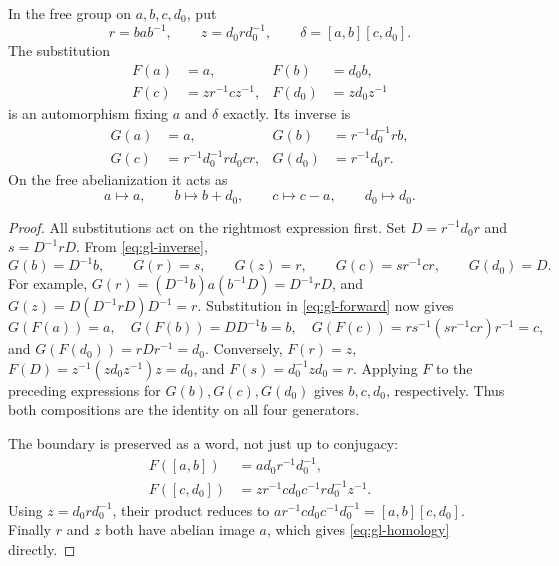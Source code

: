 \begin{lemma}\label{lem:gl-word}
In the free group on $a,b,c,d_0$, put
\[
 r=bab^{-1},\qquad z=d_0rd_0^{-1},\qquad
 \delta=[a,b][c,d_0].
\]
The substitution
\begin{equation}\label{eq:gl-forward}
 \begin{aligned}
 F(a)&=a,& F(b)&=d_0b,\\
 F(c)&=zr^{-1}cz^{-1},&F(d_0)&=zd_0z^{-1}
 \end{aligned}
\end{equation}
is an automorphism fixing $a$ and $\delta$ exactly. Its inverse is
\begin{equation}\label{eq:gl-inverse}
 \begin{aligned}
 G(a)&=a,&G(b)&=r^{-1}d_0^{-1}rb,\\
 G(c)&=r^{-1}d_0^{-1}rd_0cr,&G(d_0)&=r^{-1}d_0r.
 \end{aligned}
\end{equation}
On the free abelianization it acts as
\begin{equation}\label{eq:gl-homology}
 a\longmapsto a,\qquad b\longmapsto b+d_0,\qquad
 c\longmapsto c-a,\qquad d_0\longmapsto d_0.
\end{equation}
\end{lemma}
\begin{proof}
All substitutions act on the rightmost expression first. Set
$D=r^{-1}d_0r$ and $s=D^{-1}rD$. From \eqref{eq:gl-inverse},
\[
 G(b)=D^{-1}b,\qquad G(r)=s,\qquad G(z)=r,\qquad
 G(c)=sr^{-1}cr,\qquad G(d_0)=D.
\]
For example,
$G(r)=(D^{-1}b)a(b^{-1}D)=D^{-1}rD$, and
$G(z)=D(D^{-1}rD)D^{-1}=r$. Substitution in
\eqref{eq:gl-forward} now gives
\[
 G(F(a))=a,\quad G(F(b))=DD^{-1}b=b,\quad
 G(F(c))=rs^{-1}(sr^{-1}cr)r^{-1}=c,
\]
and $G(F(d_0))=rDr^{-1}=d_0$.
Conversely, $F(r)=z$, $F(D)=z^{-1}(zd_0z^{-1})z=d_0$, and
$F(s)=d_0^{-1}zd_0=r$. Applying $F$ to the preceding expressions
for $G(b),G(c),G(d_0)$ gives $b,c,d_0$, respectively. Thus both
compositions are the identity on all four generators.

The boundary is preserved as a word, not just up to conjugacy:
\[
 \begin{aligned}
 F([a,b])&=a d_0r^{-1}d_0^{-1},\\
 F([c,d_0])&=zr^{-1}cd_0c^{-1}rd_0^{-1}z^{-1}.
 \end{aligned}
\]
Using $z=d_0rd_0^{-1}$, their product reduces to
$ar^{-1}cd_0c^{-1}d_0^{-1}=[a,b][c,d_0]$.
Finally $r$ and $z$ both have abelian image $a$, which gives
\eqref{eq:gl-homology} directly.
\end{proof}

